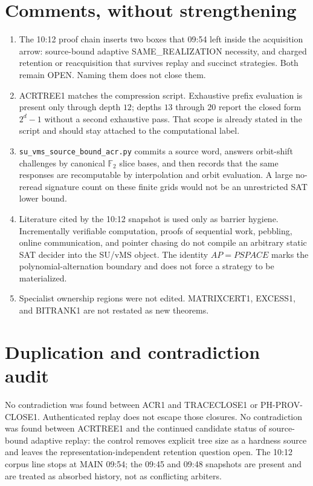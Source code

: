 \documentclass[11pt]{article}
\begin{document}
\section*{Comments, without strengthening}
\begin{enumerate}
\item The 10:12 proof chain inserts two boxes that 09:54 left inside the
acquisition arrow: source-bound adaptive SAME\_REALIZATION necessity, and charged
retention or reacquisition that survives replay and succinct strategies. Both
remain OPEN. Naming them does not close them.
\item ACRTREE1 matches the compression script. Exhaustive prefix evaluation is
present only through depth \(12\); depths \(13\) through \(20\) report the closed
form \(2^d-1\) without a second exhaustive pass. That scope is already stated in
the script and should stay attached to the computational label.
\item \texttt{su\_vms\_source\_bound\_acr.py} commits a source word, answers
orbit-shift challenges by canonical \(\mathbb F_2\) slice bases, and then records
that the same responses are recomputable by interpolation and orbit evaluation.
A large no-reread signature count on these finite grids would not be an
unrestricted SAT lower bound.
\item Literature cited by the 10:12 snapshot is used only as barrier hygiene.
Incrementally verifiable computation, proofs of sequential work, pebbling,
online communication, and pointer chasing do not compile an arbitrary static SAT
decider into the SU/vMS object. The identity \(AP=PSPACE\) marks the
polynomial-alternation boundary and does not force a strategy to be materialized.
\item Specialist ownership regions were not edited. MATRIXCERT1, EXCESS1, and
BITRANK1 are not restated as new theorems.
\end{enumerate}

\section*{Duplication and contradiction audit}
No contradiction was found between ACR1 and TRACECLOSE1 or PH-PROV-CLOSE1.
Authenticated replay does not escape those closures. No contradiction was found
between ACRTREE1 and the continued candidate status of source-bound adaptive
replay: the control removes explicit tree size as a hardness source and leaves
the representation-independent retention question open. The 10:12 corpus line
stops at MAIN 09:54; the 09:45 and 09:48 snapshots are present and are treated
as absorbed history, not as conflicting arbiters.
\end{document}
